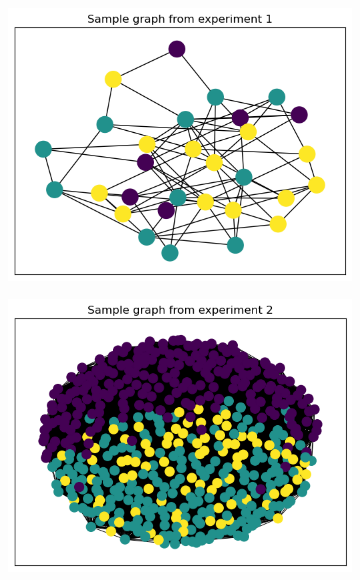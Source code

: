 \documentclass[switch, 12pt]{article}
\begin{document}
\begin{figure}[h]
    \hfill
    \centering
    \begin{subfigure}{0.28\linewidth}
        \centering
        \includegraphics[width=\linewidth]{figures/exp1_sample.png}
    \end{subfigure}
    \hfill
    \begin{subfigure}{0.28\linewidth}
        \centering
        \includegraphics[width=\linewidth]{figures/exp2_sample.png}
    \end{subfigure}
    \hfill
    \begin{subfigure}{0.28\linewidth}
        \centering

\end{subfigure}
\end{figure}
\end{document}
